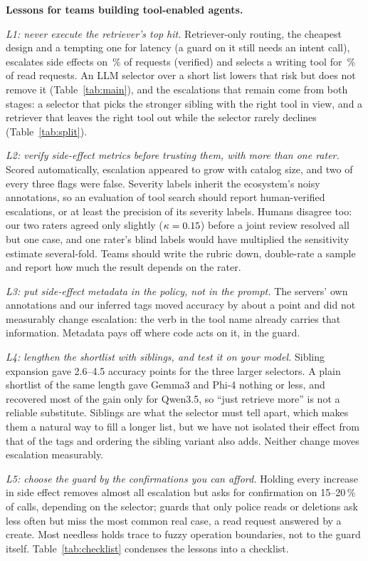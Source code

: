 \textbf{Lessons for teams building tool-enabled agents.}

\emph{L1: never execute the retriever's top hit.} Retriever-only routing, the cheapest
design and a tempting one for latency (a guard on it still needs an intent call), escalates side effects on \GRNonePoolConf\,\% of requests (verified) and selects a writing tool for
\RWRetRate\,\% of read requests. An
LLM selector over a short list lowers that risk but does not remove it (Table~\ref{tab:main}),
and the escalations that remain come from both stages: a selector that picks the stronger sibling
with the right tool in view, and a retriever that leaves the right tool out while the selector
rarely declines (Table~\ref{tab:split}).

\emph{L2: verify side-effect metrics before trusting them, with more than one rater.} Scored
automatically, escalation appeared to grow with catalog size, and two of every three flags were
false. Severity labels inherit the ecosystem's noisy annotations, so an evaluation of tool search
should report human-verified escalations, or at least the precision of its severity labels. Humans
disagree too: our two raters agreed only slightly ($\kappa=0.15$) before a joint review resolved all but one
case, and one rater's blind
labels would have multiplied the sensitivity estimate several-fold. Teams should write the rubric down,
double-rate a sample and report how much the result depends on the rater.

\emph{L3: put side-effect metadata in the policy, not in the prompt.} The servers' own
annotations and our inferred tags moved accuracy by about a point and did not measurably change
escalation: the verb in the tool name already carries that information. Metadata pays off where code acts on it, in the guard.

\emph{L4: lengthen the shortlist with siblings, and test it on your model.} Sibling expansion gave
2.6--4.5 accuracy points for the three larger selectors. A plain shortlist of the same length gave
Gemma3 and Phi-4 nothing or less, and recovered most of the gain only for Qwen3.5, so ``just
retrieve more'' is not a reliable substitute. Siblings are what the selector must tell apart, which
makes them a natural way to fill a longer list, but we have not isolated their effect from that of
the tags and ordering the sibling variant also adds.
Neither change moves escalation measurably.

\emph{L5: choose the guard by the confirmations you can afford.} Holding every increase in side
effect removes almost all escalation but asks for confirmation on 15--20\,\% of calls, depending on the selector; guards
that only police reads or deletions ask less often but miss the most common real case, a read
request answered by a create. Most needless holds trace to fuzzy operation boundaries, not to the
guard itself. Table~\ref{tab:checklist} condenses the lessons into a checklist.

